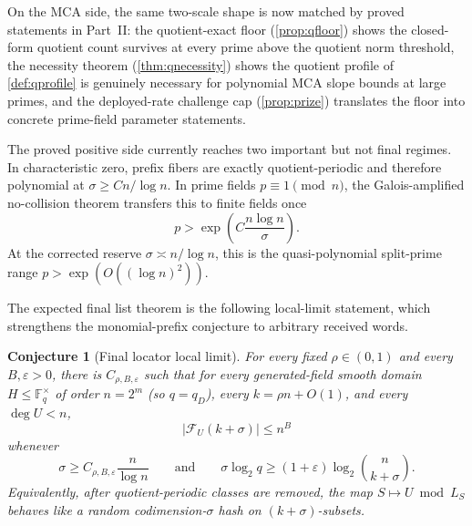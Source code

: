 \documentclass[11pt]{article}
\newtheorem{conjecture}[conjecture]{Conjecture}
\theoremstyle{definition}
\newcommand{\F}{\mathbb F}
\newcommand{\eps}{\varepsilon}
\newcommand{\Fib}{\mathcal F}
\begin{document}
On the MCA side, the same two-scale shape is now matched by proved statements in Part~II: the quotient-exact floor (\cref{prop:qfloor}) shows the closed-form quotient count survives at every prime above the quotient norm threshold, the necessity theorem (\cref{thm:qnecessity}) shows the quotient profile of \cref{def:qprofile} is genuinely necessary for polynomial MCA slope bounds at large primes, and the deployed-rate challenge cap (\cref{prop:prize}) translates the floor into concrete prime-field parameter statements.

The proved positive side currently reaches two important but not final regimes.  In characteristic zero, prefix fibers are exactly quotient-periodic and therefore polynomial at $\sigma\ge Cn/\log n$.  In prime fields $p\equiv1\pmod n$, the Galois-amplified no-collision theorem transfers this to finite fields once
\[
        p>\exp\!\left(C\frac{n\log n}{\sigma}\right).
\]
At the corrected reserve $\sigma\asymp n/\log n$, this is the quasi-polynomial split-prime range $p>\exp(O((\log n)^2))$.

The expected final list theorem is the following local-limit statement, which strengthens the monomial-prefix conjecture to arbitrary received words.
\begin{conjecture}[Final locator local limit]\label{conj:final-locator}
For every fixed $\rho\in(0,1)$ and every $B,\eps>0$, there is $C_{\rho,B,\eps}$ such that for every generated-field smooth domain $H\le\F_q^\times$ of order $n=2^m$ (so $q=q_D$), every $k=\rho n+O(1)$, and every $\deg U<n$,
\[
        |\Fib_U(k+\sigma)|\le n^B
\]
whenever
\[
        \sigma\ge C_{\rho,B,\eps}\frac n{\log n}
        \qquad\text{and}\qquad
        \sigma\log_2q\ge(1+\eps)\log_2\binom n{k+\sigma}.
\]
Equivalently, after quotient-periodic classes are removed, the map $S\mapsto U\bmod L_S$ behaves like a random codimension-$\sigma$ hash on $(k+\sigma)$-subsets.
\end{conjecture}
\end{document}
